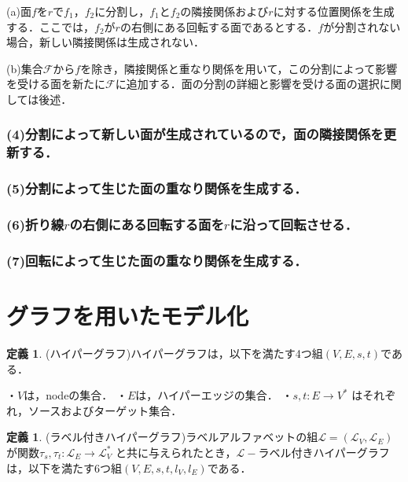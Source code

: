 \documentclass[uplatex,dvipdfmx,ja=standard]{bxjsarticle}
\theoremstyle{definition}
\newtheorem{definition}[theorem]{定義}
\numberwithin{theorem}{section}  %
\numberwithin{equation}{section} %
\begin{document}
(a)面$f$を$r$で$f_1$，$f_2$に分割し，$f_1$と$f_2$の隣接関係および$r$に対する位置関係を生成する．ここでは，$f_2$が$r$の右側にある回転する面であるとする．$f$が分割されない場合，新しい隣接関係は生成されない．

(b)集合$\mathcal{F}$から$f$を除き，隣接関係と重なり関係を用いて，この分割によって影響を受ける面を新たに$\mathcal{F}$に追加する．面の分割の詳細と影響を受ける面の選択に関しては後述．

\subsubsection*{\rm{(4)分割によって新しい面が生成されているので，面の隣接関係を更新する．}}

\subsubsection*{\rm{(5)分割によって生じた面の重なり関係を生成する．}}

\subsubsection*{\rm{(6)折り線$r$の右側にある回転する面を$r$に沿って回転させる．}}

\subsubsection*{\rm{(7)回転によって生じた面の重なり関係を生成する．}}

\section{グラフを用いたモデル化}

\begin{definition}
    (ハイパーグラフ)ハイパーグラフは，以下を満たす4つ組$(V,E,s,t)$である．
\end{definition}

    ・$V$は，nodeの集合．
    ・$E$は，ハイパーエッジの集合．
    ・$s,t:E \to V^*$ はそれぞれ，ソースおよびターゲット集合．

\begin{definition}
    (ラベル付きハイパーグラフ)ラベルアルファベットの組$\mathcal{L} = (\mathcal{L}_V , \mathcal{L}_E)$ が関数$\tau_s,\tau_t: \mathcal{L}_E \to \mathcal{L}^*_V$ と共に与えられたとき，$\mathcal{L}-$ラベル付きハイパーグラフは，以下を満たす6つ組$(V,E,s,t,l_V,l_E)$である．
\end{definition}
\end{document}

